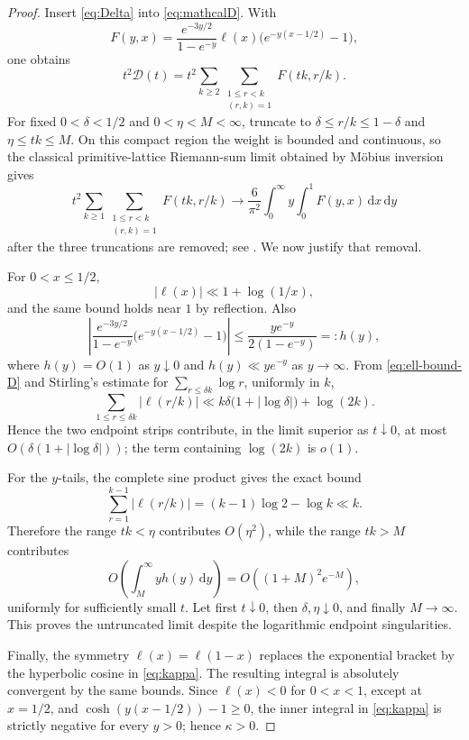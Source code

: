 \documentclass[11pt]{amsart}
\numberwithin{equation}{section}
\theoremstyle{definition}
\theoremstyle{remark}
\newcommand{\dd}{\,\mathrm d}
\begin{document}
\begin{proof}
Insert \eqref{eq:Delta} into \eqref{eq:mathcalD}.  With
\[
 F(y,x)=\frac{e^{-3y/2}}{1-e^{-y}}\ell(x)
 \bigl(e^{-y(x-1/2)}-1\bigr),
\]
one obtains
\[
 t^2\mathcal D(t)
 =t^2\sum_{k\geq2}\sum_{\substack{1\leq r<k\\(r,k)=1}}
 F(tk,r/k).
\]
For fixed \(0<\delta<1/2\) and \(0<\eta<M<\infty\), truncate to
\(\delta\leq r/k\leq1-\delta\) and \(\eta\leq tk\leq M\).  On this
compact region the weight is bounded and continuous, so the classical
primitive-lattice Riemann-sum limit obtained by M\"obius inversion gives
\[
 t^2\sum_{k\geq1}\sum_{\substack{1\leq r<k\\(r,k)=1}}
 F(tk,r/k)
 \longrightarrow\frac6{\pi^2}\int_0^\infty y
 \int_0^1F(y,x)\dd x\dd y
\]
after the three truncations are removed; see
\cite[Chapter~XVIII]{HardyWright2008}.  We now justify that removal.

For \(0<x\leq1/2\),
\begin{equation}\label{eq:ell-bound-D}
 |\ell(x)|\ll1+\log(1/x),
\end{equation}
and the same bound holds near \(1\) by reflection.  Also
\[
 \left|\frac{e^{-3y/2}}{1-e^{-y}}
 \bigl(e^{-y(x-1/2)}-1\bigr)\right|
 \leq \frac{y e^{-y}}{2(1-e^{-y})}=:h(y),
\]
where \(h(y)=O(1)\) as \(y\downarrow0\) and
\(h(y)\ll y e^{-y}\) as \(y\to\infty\).  From
\eqref{eq:ell-bound-D} and Stirling's estimate for
\(\sum_{r\leq \delta k}\log r\), uniformly in \(k\),
\begin{equation}\label{eq:boundary-discrete}
 \sum_{1\leq r\leq\delta k}|\ell(r/k)|
 \ll k\delta\bigl(1+|\log\delta|\bigr)+\log(2k).
\end{equation}
Hence the two endpoint strips contribute, in the limit superior as
\(t\downarrow0\), at most
\(O(\delta(1+|\log\delta|))\); the term containing \(\log(2k)\)
is \(o(1)\).

For the \(y\)-tails, the complete sine product gives the exact bound
\[
 \sum_{r=1}^{k-1}|\ell(r/k)|
 =(k-1)\log2-\log k\ll k.
\]
Therefore the range \(tk<\eta\) contributes \(O(\eta^2)\), while the
range \(tk>M\) contributes
\[
 O\!\left(\int_M^\infty y h(y)\dd y\right)
 =O\!\left((1+M)^2e^{-M}\right),
\]
uniformly for sufficiently small \(t\).  Let first \(t\downarrow0\), then
\(\delta,\eta\downarrow0\), and finally \(M\to\infty\).  This proves the
untruncated limit despite the logarithmic endpoint singularities.

Finally, the symmetry \(\ell(x)=\ell(1-x)\) replaces the exponential
bracket by the hyperbolic cosine in \eqref{eq:kappa}.  The resulting
integral is absolutely convergent by the same bounds.  Since
\(\ell(x)<0\) for \(0<x<1\), except at \(x=1/2\), and
\(\cosh(y(x-1/2))-1\geq0\), the inner integral in
\eqref{eq:kappa} is strictly negative for every \(y>0\); hence
\(\kappa>0\).
\end{proof}
\end{document}

